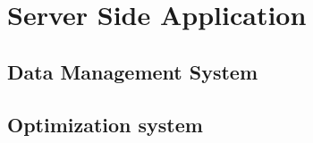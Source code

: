 \section{Server Side Application}
\label{sec:ssa_design}



\subsection{Data Management System}
\label{sec:dms_design}


\subsection{Optimization system}
\label{sec:os_design}

